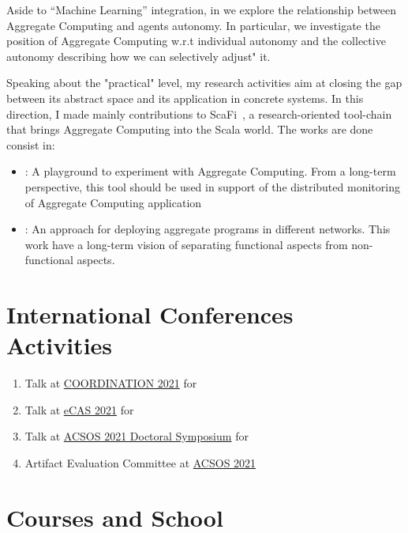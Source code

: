 \documentclass[12pt]{article}
\begin{document}
Aside to ``Machine Learning'' integration, in \textit{} we explore the relationship
 between Aggregate Computing and agents autonomy. In particular, we investigate the position of Aggregate Computing 
 w.r.t individual autonomy and the collective autonomy describing how we can selectively adjust" it. 

Speaking about the "practical" level, my research activities aim at closing the gap between
 its abstract space and its application in concrete systems. 
%
In this direction, I made mainly contributions to ScaFi~\cite{scafi}, 
 a research-oriented tool-chain that brings Aggregate Computing into the Scala world. The works are done consist in:

\begin{itemize}
  \item \textit{}: 
	A playground to experiment with Aggregate Computing. From a long-term perspective, this tool should be used in support of
  the distributed monitoring of Aggregate Computing application
  \item \textit{}: 
	An approach for deploying aggregate programs in different networks. This work have a long-term vision of separating functional aspects from non-functional aspects.
\end{itemize}

\section{International Conferences Activities}
\begin{enumerate}
	\item Talk at \href{https://www.discotec.org/2021/programme}{COORDINATION 2021} for \cite{scafiweb}
	\item Talk at \href{https://apice.unibo.it/xwiki/bin/view/ECAS2021/Program}{eCAS 2021} for \cite{scafiloci}
	\item Talk at \href{https://conf.researchr.org/program/acsos-2021/program-acsos-2021/?date=Fri%201%20Oct%202021}{ACSOS 2021 Doctoral Symposium} for \cite{research}
	\item Artifact Evaluation Committee at \href{https://conf.researchr.org/committee/acsos-2021/acsos-2021-papers-artifact-evaluation-committee}{ACSOS 2021}
\end{enumerate}
\section{Courses and School}
\end{document}
